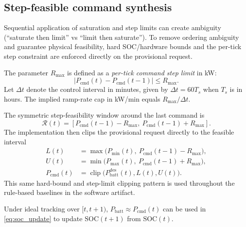 \documentclass[preprint,12pt]{elsarticle}
\newcommand{\Rmax}{R_{\max}}
\newcommand{\SOC}{\mathrm{SOC}}
\newcommand{\Pbatt}{P_{\mathrm{batt}}}
\newcommand{\Pcmd}{P_{\mathrm{cmd}}}
\newcommand{\Ts}{T_s}
\DeclareMathOperator{\clip}{clip}
\begin{document}
\subsection{Step-feasible command synthesis}
\label{subsec:cmd_synthesis}
Sequential application of saturation and step limits can create ambiguity (``saturate then limit'' vs ``limit then saturate''). To remove ordering ambiguity and guarantee physical feasibility, hard SOC/hardware bounds and the per-tick step constraint are enforced directly on the provisional request.

The parameter $\Rmax$ is defined as a \emph{per-tick command step limit} in kW:
\begin{equation}
|\Pcmd(t)-\Pcmd(t-1)| \le \Rmax.
\end{equation}
Let $\Delta t$ denote the control interval in minutes, given by $\Delta t = 60\Ts$ when $\Ts$ is in hours. The implied ramp-rate cap in kW/min equals $\Rmax/\Delta t$.

The symmetric step-feasibility window around the last command is
\begin{equation}
\mathcal{R}(t)=\left[\Pcmd(t-1)-\Rmax,\ \Pcmd(t-1)+\Rmax\right].
\end{equation}
The implementation then clips the provisional request directly to the feasible interval
\begin{align}
L(t) &= \max\!\big(P_{\min}(t),\ \Pcmd(t-1)-\Rmax\big),\\
U(t) &= \min\!\big(P_{\max}(t),\ \Pcmd(t-1)+\Rmax\big),\\
\Pcmd(t) &= \clip\!\big(\Pbatt^{\mathrm{des}}(t),L(t),U(t)\big).
\label{eq:pcmd_final}
\end{align}
This same hard-bound and step-limit clipping pattern is used throughout the rule-based baselines in the software artifact.

Under ideal tracking over $[t,t{+}1)$, $\Pbatt \approx \Pcmd(t)$ can be used in \eqref{eq:soc_update} to update $\SOC(t{+}1)$ from $\SOC(t)$.
\end{document}
